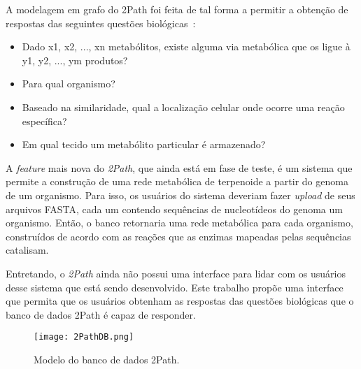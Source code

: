 \indent A modelagem em grafo do 2Path foi feita de tal forma a permitir a obtenção de respostas das seguintes questões biológicas~\cite{waldeyr}:	

\begin{itemize}
\item Dado x{\small 1}, x{\small 2}, ..., x{\small n} metabólitos, existe alguma via metabólica que os ligue à y{\small 1}, y{\small 2}, ..., y{\small m} produtos?
\item Para qual organismo?
\item Baseado na similaridade, qual a localização celular onde ocorre uma reação específica?
\item Em qual tecido um metabólito particular é armazenado?
\end{itemize}

\indent A \textit{feature} mais nova do \textit{2Path}, que ainda está em fase de teste, é um sistema que permite a construção de uma rede metabólica de terpenoide a partir do genoma de um organismo. Para isso, os usuários do sistema deveriam fazer \textit{upload} de seus arquivos FASTA, cada um contendo sequências de nucleotídeos do genoma um organismo. Então, o banco retornaria uma rede metabólica para cada organismo, construídos de acordo com as reações que as enzimas mapeadas pelas sequências catalisam.

\indent Entretando, o \textit{2Path} ainda não possui uma interface para lidar com os usuários desse sistema que está sendo desenvolvido. Este trabalho propõe uma interface que permita que os usuários obtenham as respostas das questões biológicas que o banco de dados 2Path é capaz de responder. \\
\newpage
\begin{figure}[!h]
\centering
\texttt{[image: 2PathDB.png]}
\caption{Modelo do banco de dados 2Path.}
\label{2PathDB}
\end{figure}

